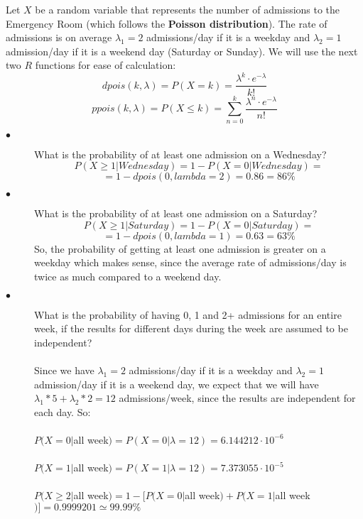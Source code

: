 \documentclass[12pt,a4paper]{article}
\begin{document}
Let $X$ be a random variable that represents the number of admissions to the Emergency Room (which follows the \textbf{Poisson distribution}). The rate of admissions is on average $\lambda_1=2$ admissions/day if it is a weekday and $\lambda_2=1$ admission/day if it is a weekend day (Saturday or Sunday). We will use the next two $R$ functions for ease of calculation: 
$$dpois(k, \lambda) = P(X=k)=\frac{\lambda^k\cdot e^{-\lambda}}{k!}$$
$$ppois(k, \lambda) = P(X\leq k)=\sum_{n=0}^{k} \frac{\lambda^n\cdot e^{-\lambda}}{n!}$$

\begin{description}
  \item[$\bullet$] What is the probability of at least one admission on a Wednesday?
  $$P(X\geq 1|Wednesday)=1-P(X=0|Wednesday)=$$
  $$=1-dpois(0, lambda=2)=0.86=86\%$$
  \item[$\bullet$] What is the probability of at least one admission on a Saturday?
  $$P(X\geq 1|Saturday)=1-P(X=0|Saturday)=$$
  $$=1-dpois(0, lambda=1)=0.63=63\%$$
  So, the probability of getting at least one admission is greater on a weekday which makes sense, since the average rate of admissions/day is twice as much compared to a weekend day.
  \item[$\bullet$] What is the probability of having 0, 1 and 2+ admissions for an entire week, if the results for different days during the week are assumed to be independent?
  \\\\
  Since we have $\lambda_1=2$ admissions/day if it is a weekday and $\lambda_2=1$ admission/day if it is a weekend day, we expect that we will have $\lambda_1*5+\lambda_2*2=12$ admissions/week, since the results are independent for each day. So:
  \\\\
  $P(X=0|$all week$)=P(X=0|\lambda=12)=6.144212 \cdot 10^{-6}$
  \\\\
  $P(X=1|$all week$)=P(X=1|\lambda=12)=7.373055 \cdot 10^{-5}$
  \\\\
  $P(X\geq2|$all week$)=1-[P(X=0|$all week$)+P(X=1|$all week$)]=0.9999201\simeq 99.99\%$
\end{description}
\end{document}

